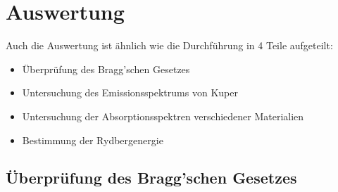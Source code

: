 \section{Auswertung}
\label{sec:Auswertung}



Auch die Auswertung ist ähnlich wie die Durchführung in 4 Teile aufgeteilt:
\begin{itemize}
    \item Überprüfung des Bragg'schen Gesetzes
    \item Untersuchung des Emissionsspektrums von Kuper
    \item Untersuchung der Absorptionsspektren verschiedener Materialien
    \item Bestimmung der Rydbergenergie
\end{itemize}

\subsection{Überprüfung des Bragg'schen Gesetzes}
\label{ssec:bragg_auswertung}

